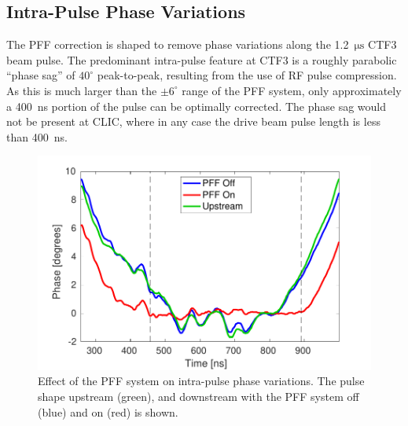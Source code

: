 \documentclass[%
 reprint,
superscriptaddress,
 amsmath,amssymb,
 prl,
]{revtex4-1}
\begin{document}
\subsection{\label{ss:shape}Intra-Pulse Phase Variations}

The PFF correction is shaped to remove phase variations along the 
1.2~\(\mathrm{\mu s}\) CTF3 beam pulse. The predominant intra-pulse feature at 
CTF3
is a roughly parabolic ``phase sag'' of \(40^\circ\) peak-to-peak, resulting 
from the use of RF pulse compression. As this is much larger than the 
\(\pm 6^\circ\) range of the PFF system, only approximately a 400~ns portion of 
the pulse can be optimally corrected. The phase sag would not be present at 
CLIC, where in any case the drive beam pulse length is less than 400~ns.



\begin{figure}
	\includegraphics[width=\columnwidth]{figs/shape}%
	\caption{\label{fig:shape}Effect of the PFF system on intra-pulse phase 
		variations. The pulse shape upstream (green), and downstream with the 
		PFF 
		system off (blue) and on (red) is shown.}
\end{figure}
\end{document}
